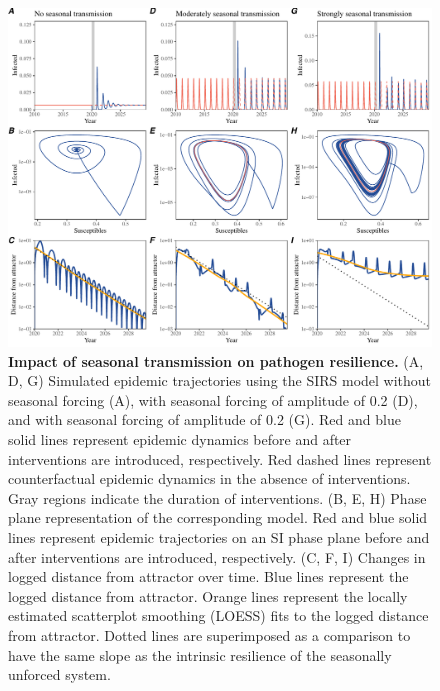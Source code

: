 \documentclass[12pt]{article}
\begin{document}
\begin{figure}[!th]
\includegraphics[width=\textwidth]{../figure2/figure2_simple_seas.pdf}
\caption{
\textbf{Impact of seasonal transmission on pathogen resilience.}
(A, D, G) Simulated epidemic trajectories using the SIRS model without seasonal forcing (A), with seasonal forcing of amplitude of 0.2 (D), and with seasonal forcing of amplitude of 0.2 (G).
Red and blue solid lines represent epidemic dynamics before and after interventions are introduced, respectively.
Red dashed lines represent counterfactual epidemic dynamics in the absence of interventions.
Gray regions indicate the duration of interventions.
(B, E, H) Phase plane representation of the corresponding model.
Red and blue solid lines represent epidemic trajectories on an SI phase plane before and after interventions are introduced, respectively.
(C, F, I) Changes in logged distance from attractor over time.
Blue lines represent the logged distance from attractor.
Orange lines represent the locally estimated scatterplot smoothing (LOESS) fits to the logged distance from attractor.
Dotted lines are superimposed as a comparison to have the same slope as the intrinsic resilience of the seasonally unforced system.
}
\end{figure}

\pagebreak
\end{document}
